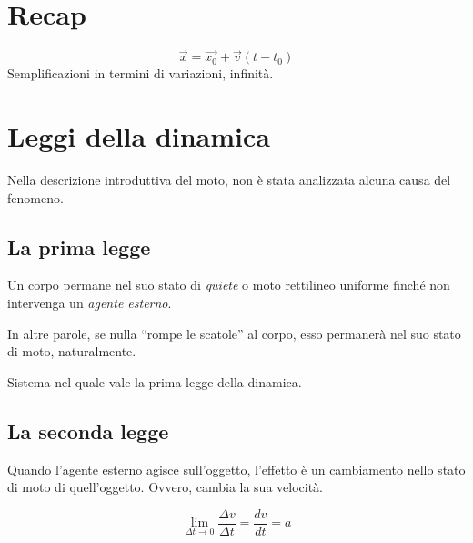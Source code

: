 %

\marginpar{\minitoc}

\section{Recap}
\[ \overrightarrow{x} = \overrightarrow{x_0} + \overrightarrow{v}(t - t_0) \]
Semplificazioni in termini di variazioni, infinità.

\section{Leggi della dinamica}

Nella descrizione introduttiva del moto, non è stata analizzata alcuna causa del
fenomeno.

\subsection{La prima legge}

\vspace{8pt}
\begin{tcolorbox}[colback = red!30, colframe = red!30!black, title = {Prima legge della dinamica (legge di inerzia)}]
    Un corpo permane nel suo stato di \textit{quiete} o moto rettilineo uniforme
    finché non intervenga un \textit{agente esterno}.
\end{tcolorbox}
\vspace{5pt}

In altre parole, se nulla ``rompe le scatole'' al corpo, esso permanerà nel suo
stato di moto, naturalmente.

\vspace{8pt}
\begin{tcolorbox}[colback = yellow!30, colframe = yellow!30!black, title = {Sistema inerziale}]
    Sistema nel quale vale la prima legge della dinamica.
\end{tcolorbox}
\vspace{5pt}

\subsection{La seconda legge}
Quando l'agente esterno agisce sull'oggetto, l'effetto è un cambiamento nello
stato di moto di quell'oggetto. Ovvero, cambia la sua velocità.

\[ \lim_{\Delta t \to 0} \frac{\Delta v}{\Delta t} = \frac{dv}{dt} = a \]

